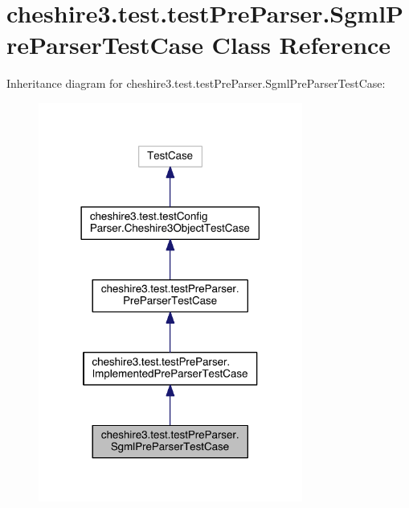 \hypertarget{classcheshire3_1_1test_1_1test_pre_parser_1_1_sgml_pre_parser_test_case}{\section{cheshire3.\-test.\-test\-Pre\-Parser.\-Sgml\-Pre\-Parser\-Test\-Case Class Reference}
\label{classcheshire3_1_1test_1_1test_pre_parser_1_1_sgml_pre_parser_test_case}
}


Inheritance diagram for cheshire3.\-test.\-test\-Pre\-Parser.\-Sgml\-Pre\-Parser\-Test\-Case\-:
\nopagebreak
\begin{figure}[H]
\begin{center}
\leavevmode
\includegraphics[width=246pt]{classcheshire3_1_1test_1_1test_pre_parser_1_1_sgml_pre_parser_test_case__inherit__graph}
\end{center}
\end{figure}


